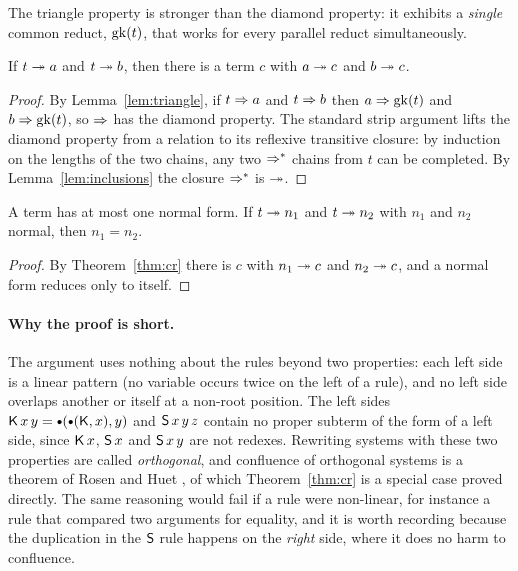 The triangle property is stronger than the diamond property: it exhibits a \emph{single} common reduct, $\mathrm{gk}(t)$, that works for every parallel reduct simultaneously.

\begin{theorem}\label{thm:cr}
If $t\twoheadrightarrow a$ and $t\twoheadrightarrow b$, then there is a term $c$ with $a\twoheadrightarrow c$ and $b\twoheadrightarrow c$.
\end{theorem}

\begin{proof}
By Lemma~\ref{lem:triangle}, if $t\Rightarrow a$ and $t\Rightarrow b$ then $a\Rightarrow\mathrm{gk}(t)$ and $b\Rightarrow\mathrm{gk}(t)$, so $\Rightarrow$ has the diamond property. The standard strip argument lifts the diamond property from a relation to its reflexive transitive closure: by induction on the lengths of the two chains, any two $\Rightarrow^*$ chains from $t$ can be completed. By Lemma~\ref{lem:inclusions} the closure $\Rightarrow^*$ is $\twoheadrightarrow$.
\end{proof}

\begin{corollary}\label{cor:unique}
A term has at most one normal form. If $t\twoheadrightarrow n_1$ and $t\twoheadrightarrow n_2$ with $n_1$ and $n_2$ normal, then $n_1=n_2$.
\end{corollary}

\begin{proof}
By Theorem~\ref{thm:cr} there is $c$ with $n_1\twoheadrightarrow c$ and $n_2\twoheadrightarrow c$, and a normal form reduces only to itself.
\end{proof}

\paragraph{Why the proof is short.} The argument uses nothing about the rules beyond two properties: each left side is a linear pattern (no variable occurs twice on the left of a rule), and no left side overlaps another or itself at a non-root position. The left sides $\Kc\,x\,y=\App(\App(\Kc,x),y)$ and $\mathsf{S}\,x\,y\,z$ contain no proper subterm of the form of a left side, since $\mathsf{K}\,x$, $\mathsf{S}\,x$ and $\mathsf{S}\,x\,y$ are not redexes. Rewriting systems with these two properties are called \emph{orthogonal}, and confluence of orthogonal systems is a theorem of Rosen \cite{rosen} and Huet \cite{huet}, of which Theorem~\ref{thm:cr} is a special case proved directly. The same reasoning would fail if a rule were non-linear, for instance a rule that compared two arguments for equality, and it is worth recording because the duplication in the $\mathsf{S}$ rule happens on the \emph{right} side, where it does no harm to confluence.

